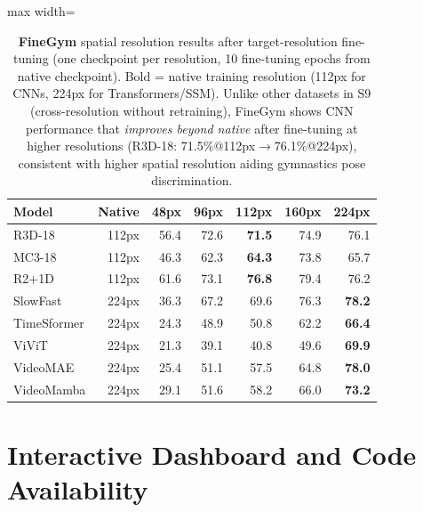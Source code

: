 \documentclass[a4paper, 10pt, conference, onecolumn]{ieeeconf}
\newcommand{\tabtight}{\setlength{\tabcolsep}{3.5pt}\renewcommand{\arraystretch}{1.12}}
\begin{document}
\begin{table}[!htbp]
\centering
\caption{\textbf{FineGym} spatial resolution results after target-resolution fine-tuning (one checkpoint per resolution, 10 fine-tuning epochs from native checkpoint). Bold = native training resolution (112px for CNNs, 224px for Transformers/SSM). Unlike other datasets in S9 (cross-resolution without retraining), FineGym shows CNN performance that \emph{improves beyond native} after fine-tuning at higher resolutions (R3D-18: 71.5\%@112px$\to$76.1\%@224px), consistent with higher spatial resolution aiding gymnastics pose discrimination.}
\label{tab:sup_sp_finegym}
\scriptsize\tabtight
\begin{adjustbox}{max width=\textwidth}
\begin{tabular}{l r rrrrr}
\toprule
Model & Native & 48px & 96px & 112px & 160px & 224px \\
\midrule
R3D-18      & 112px & 56.4 & 72.6 & \textbf{71.5} & 74.9 & 76.1 \\
MC3-18      & 112px & 46.3 & 62.3 & \textbf{64.3} & 73.8 & 65.7 \\
R2+1D       & 112px & 61.6 & 73.1 & \textbf{76.8} & 79.4 & 76.2 \\
SlowFast    & 224px & 36.3 & 67.2 & 69.6 & 76.3 & \textbf{78.2} \\
\midrule
TimeSformer & 224px & 24.3 & 48.9 & 50.8 & 62.2 & \textbf{66.4} \\
ViViT       & 224px & 21.3 & 39.1 & 40.8 & 49.6 & \textbf{69.9} \\
VideoMAE    & 224px & 25.4 & 51.1 & 57.5 & 64.8 & \textbf{78.0} \\
VideoMamba  & 224px & 29.1 & 51.6 & 58.2 & 66.0 & \textbf{73.2} \\
\bottomrule
\end{tabular}
\end{adjustbox}
\end{table}

\section{Interactive Dashboard and Code Availability}
\label{sec:sup_dashboard}
\end{document}
